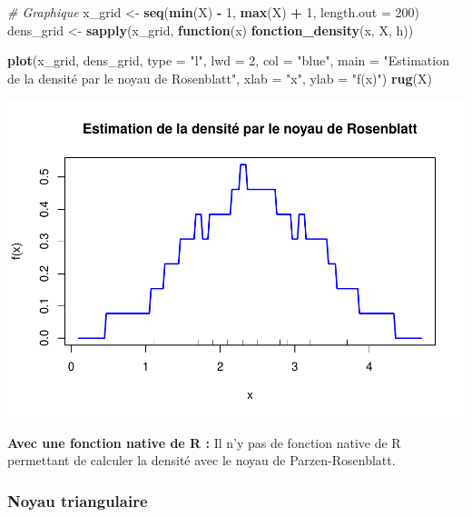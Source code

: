 \documentclass[
  12pt,
]{article}
\newenvironment{Shaded}{\begin{snugshade}}{\end{snugshade}}
\newcommand{\AttributeTok}[1]{\textcolor[rgb]{0.13,0.29,0.53}{#1}}
\newcommand{\CommentTok}[1]{\textcolor[rgb]{0.56,0.35,0.01}{\textit{#1}}}
\newcommand{\ControlFlowTok}[1]{\textcolor[rgb]{0.13,0.29,0.53}{\textbf{#1}}}
\newcommand{\DecValTok}[1]{\textcolor[rgb]{0.00,0.00,0.81}{#1}}
\newcommand{\FunctionTok}[1]{\textcolor[rgb]{0.13,0.29,0.53}{\textbf{#1}}}
\newcommand{\NormalTok}[1]{#1}
\newcommand{\OtherTok}[1]{\textcolor[rgb]{0.56,0.35,0.01}{#1}}
\newcommand{\SpecialCharTok}[1]{\textcolor[rgb]{0.81,0.36,0.00}{\textbf{#1}}}
\newcommand{\StringTok}[1]{\textcolor[rgb]{0.31,0.60,0.02}{#1}}
\begin{document}
\begin{Shaded}
\begin{Highlighting}[]
\CommentTok{\# Graphique}
\NormalTok{x\_grid }\OtherTok{\textless{}{-}} \FunctionTok{seq}\NormalTok{(}\FunctionTok{min}\NormalTok{(X) }\SpecialCharTok{{-}} \DecValTok{1}\NormalTok{, }\FunctionTok{max}\NormalTok{(X) }\SpecialCharTok{+} \DecValTok{1}\NormalTok{, }\AttributeTok{length.out =} \DecValTok{200}\NormalTok{)}
\NormalTok{dens\_grid }\OtherTok{\textless{}{-}} \FunctionTok{sapply}\NormalTok{(x\_grid, }\ControlFlowTok{function}\NormalTok{(x) }\FunctionTok{fonction\_density}\NormalTok{(x, X, h))}

\FunctionTok{plot}\NormalTok{(x\_grid, dens\_grid, }\AttributeTok{type =} \StringTok{"l"}\NormalTok{, }\AttributeTok{lwd =} \DecValTok{2}\NormalTok{, }\AttributeTok{col =} \StringTok{"blue"}\NormalTok{,}
     \AttributeTok{main =} \StringTok{"Estimation de la densité par le noyau de Rosenblatt"}\NormalTok{,}
     \AttributeTok{xlab =} \StringTok{"x"}\NormalTok{, }\AttributeTok{ylab =} \StringTok{"f(x)"}\NormalTok{)}
\FunctionTok{rug}\NormalTok{(X)  }
\end{Highlighting}
\end{Shaded}

\includegraphics{Stat_non_para_files/figure-latex/unnamed-chunk-150-1.pdf}

\textbf{Avec une fonction native de R :} Il n'y pas de fonction native
de R permettant de calculer la densité avec le noyau de
Parzen-Rosenblatt.

\subsubsection{Noyau triangulaire}\label{noyau-triangulaire}
\end{document}
